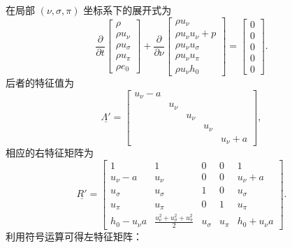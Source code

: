 在局部 $(\nu,\sigma,\pi)$ 坐标系下的展开式为
\begin{equation}
\frac{\partial}{\partial t}\begin{bmatrix}\rho\\
\rho u_{\nu}\\
\rho u_{\sigma}\\
\rho u_{\pi}\\
\rho e_{0}
\end{bmatrix}+\frac{\partial}{\partial\nu}\begin{bmatrix}\rho u_{\nu}\\
\rho u_{\nu}u_{\nu}+p\\
\rho u_{\nu}u_{\sigma}\\
\rho u_{\nu}u_{\pi}\\
\rho u_{\nu}h_{0}
\end{bmatrix}=\begin{bmatrix}0\\
0\\
0\\
0\\
0
\end{bmatrix}.
\end{equation}
后者的特征值为
\begin{equation}
\underline{\varLambda'}=\begin{bmatrix}u_{\nu}-a\\
 & u_{\nu}\\
 &  & u_{\nu}\\
 &  &  & u_{\nu}\\
 &  &  &  & u_{\nu}+a
\end{bmatrix},
\end{equation}
相应的右特征矩阵为
\begin{equation}
\underline{R'}=\begin{bmatrix}1 & 1 & 0 & 0 & 1\\
u_{\nu}-a & u_{\nu} & 0 & 0 & u_{\nu}+a\\
u_{\sigma} & u_{\sigma} & 1 & 0 & u_{\sigma}\\
u_{\pi} & u_{\pi} & 0 & 1 & u_{\pi}\\
h_{0}-u_{\nu}a & \frac{u_{\nu}^{2}+u_{\sigma}^{2}+u_{\pi}^{2}}{2} & u_{\sigma} & u_{\pi} & h_{0}+u_{\nu}a
\end{bmatrix}.
\end{equation}
利用符号运算可得左特征矩阵：
